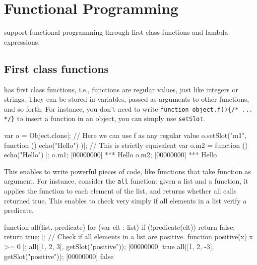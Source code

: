 
\chapter{Functional Programming}
\label{sec:tut:functional}

\us support functional programming through first class functions and
lambda expressions.

\section{First class functions}

\us has first class functions, i.e., functions are regular values,
just like integers or strings. They can be stored in variables,  passed
as arguments to other functions, and so forth. For instance, you don't need
to write
\lstinline|function object.f(){/* ... */}| to insert a function in an
object, you can simply use \lstinline{setSlot}.

\begin{urbiscript}[firstnumber=1]
var o = Object.clone|;
// Here we can use f as any regular value
o.setSlot("m1", function () { echo("Hello") })|;
// This is strictly equivalent
var o.m2 = function () { echo("Hello") }|;
o.m1;
[00000000] *** Hello
o.m2;
[00000000] *** Hello
\end{urbiscript}

This enables to write powerful pieces of code, like functions that
take function as argument. For instance, consider the \lstinline{all}
function: given a list and a function, it applies the function to each
element of the list, and returns whether all calls returned true. This
enables to check very simply if all elements in a list verify a
predicate.

\begin{urbiscript}
function all(list, predicate)
{
  for (var elt : list)
    if (!predicate(elt))
      return false;
  return true;
}|;
// Check if all elements in a list are positive.
function positive(x) { x >= 0 }|;
all([1, 2, 3], getSlot("positive"));
[00000000] true
all([1, 2, -3], getSlot("positive"));
[00000000] false
\end{urbiscript}

